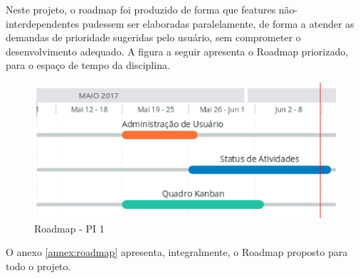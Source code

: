 Neste projeto, o roadmap foi produzido de forma que features não-interdependentes pudessem ser elaboradas paralelamente, de
forma a atender as demandas de prioridade sugeridas pelo usuário, sem comprometer o desenvolvimento adequado. A figura a
seguir apresenta o Roadmap priorizado, para o espaço de tempo da disciplina.

\begin{figure}[!h]
        \centering
        \includegraphics[keepaspectratio=true,scale=0.8]{figuras/roadm.eps}
        \caption{Roadmap - PI 1}
\end{figure}

O anexo \ref{annex:roadmap} apresenta, integralmente, o Roadmap proposto para todo o projeto.
